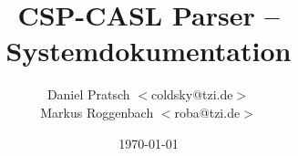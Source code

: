 \documentclass[11pt, twoside]{article}
\author{Daniel Pratsch $<$coldsky@tzi.de$>$\\
         Markus Roggenbach $<$roba@tzi.de$>$}
\title{CSP-CASL Parser -- Systemdokumentation}
\date{\today}
\begin{document}
\maketitle

\tableofcontents

\begin{appendix}


%
%

\end{appendix}
\end{document}
